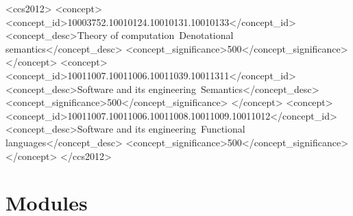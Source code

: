 \documentclass[sigplan,screen]{acmart}
\begin{document}

\begin{CCSXML}
<ccs2012>
   <concept>
       <concept_id>10003752.10010124.10010131.10010133</concept_id>
       <concept_desc>Theory of computation~Denotational semantics</concept_desc>
       <concept_significance>500</concept_significance>
       </concept>
  <concept>
       <concept_id>10011007.10011006.10011039.10011311</concept_id>
       <concept_desc>Software and its engineering~Semantics</concept_desc>
       <concept_significance>500</concept_significance>
       </concept>
   <concept>
       <concept_id>10011007.10011006.10011008.10011009.10011012</concept_id>
       <concept_desc>Software and its engineering~Functional languages</concept_desc>
       <concept_significance>500</concept_significance>
       </concept>
 </ccs2012>
\end{CCSXML}

%



\maketitle


\pagebreak

\tableofcontents

\section*{Modules}
\end{document}
